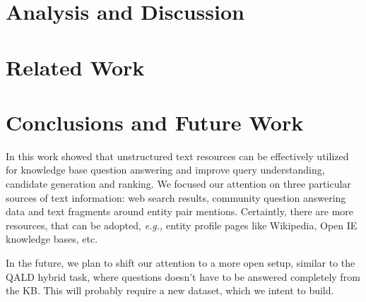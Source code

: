 \documentclass{sig-alternate-05-2015}
\newcommand{\eg}[0]{{\em e.g., }}
\begin{document}
\section{Analysis and Discussion}
\label{section:analysis}


\section{Related Work}
\label{section:related_work}


\section{Conclusions and Future Work}

In this work showed that unstructured text resources can be effectively utilized for knowledge base question answering and improve query understanding, candidate generation and ranking.
We focused our attention on three particular sources of text information: web search results, community question answering data and text fragments around entity pair mentions.
Certaintly, there are more resources, that can be adopted, \eg entity profile pages like Wikipedia, Open IE knowledge bases, etc.

In the future, we plan to shift our attention to a more open setup, similar to the QALD hybrid task, where questions doesn't have to be answered completely from the KB.
This will probably require a new dataset, which we intent to build.




%

%
%
\end{document}
